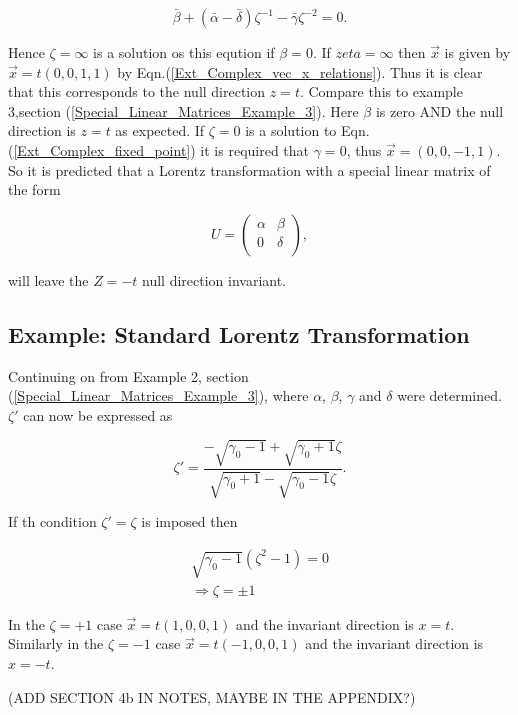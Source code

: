 \begin{equation*}
\bar{\beta} + (\bar{\alpha}- \bar{\delta})\zeta^{-1} - \bar{\gamma}\zeta^{-2} = 0.
\end{equation*}

\noindent Hence $\zeta = \infty$ is a solution os this eqution if $\beta = 0$. If $zeta = \infty$ then $\vec{x}$ is given by $\vec{x} = t(0,0,1,1)$ by Eqn.(\ref{Ext_Complex_vec_x_relations}). Thus it is clear that this corresponds to the null direction $z=t$. Compare this to example 3,section (\ref{Special_Linear_Matrices_Example_3}). Here $\beta$ is zero AND the null direction is $z=t$ as expected. If $\zeta = 0$ is a solution to Eqn.(\ref{Ext_Complex_fixed_point}) it is required that $\gamma = 0$, thus $\vec{x} = (0,0,-1,1)$. So it is predicted that a Lorentz transformation with a special linear matrix of the form

\begin{equation*}   
U = 
\left(
\begin{array}{cc}
\alpha & \beta \\
0 & \delta \\
\end{array}
\right),
\end{equation*}   

\noindent will leave the $Z=-t$ null direction invariant.

\subsection{Example: Standard Lorentz Transformation}

Continuing on from Example 2, section (\ref{Special_Linear_Matrices_Example_3}), where $\alpha$, $\beta$, $\gamma$ and $\delta$ were determined. $\zeta'$ can now be expressed as

\begin{equation*} 
\zeta' = \frac{-\sqrt{\gamma_0 - 1} + \sqrt{\gamma_0 + 1}\zeta}{\sqrt{\gamma_0 + 1} - \sqrt{\gamma_0 - 1}\zeta}.
\end{equation*}

If th condition $\zeta' = \zeta$ is imposed then

\begin{eqnarray*}
\sqrt{\gamma_0 - 1}(\zeta^2 - 1) = 0 \\
\Rightarrow \zeta = \pm 1
\end{eqnarray*}

In the $\zeta = +1$ case $\vec{x} = t(1,0,0,1)$ and the invariant direction is $x=t$. Similarly in the $\zeta = -1$ case $\vec{x} = t(-1,0,0,1)$ and the invariant direction is $x = - t$. 

(ADD SECTION 4b IN NOTES, MAYBE IN THE APPENDIX?)





   












